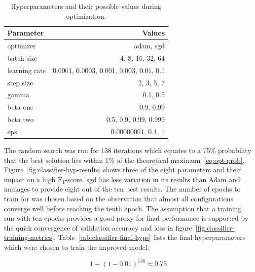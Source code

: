 \documentclass[draft,final]{vutinfth} %
\begin{document}
\begin{table}[h]
  \centering
  \begin{tabular}{lr}
    \toprule
    Parameter &  Values \\
    \midrule
    optimizer &	adam, sgd \\
    batch size & 4, 8, 16, 32, 64 \\
    learning rate & 0.0001, 0.0003, 0.001, 0.003, 0.01, 0.1 \\
    step size & 2, 3, 5, 7 \\
    gamma & 0.1, 0.5 \\
    beta one & 0.9, 0.99 \\
    beta two & 0.5, 0.9, 0.99, 0.999 \\
    eps & 0.00000001, 0.1, 1 \\
    \bottomrule
  \end{tabular}
  \caption{Hyperparameters and their possible values during
    optimization.}
  \label{tab:classifier-hyps}
\end{table}

The random search was run for \num{138} iterations which equates to a
75\% probability that the best solution lies within 1\% of the
theoretical
maximum~\eqref{eq:opt-prob}. Figure~\ref{fig:classifier-hyp-results}
shows three of the eight parameters and their impact on a high
$\mathrm{F}_1$-score. \gls{sgd} has less variation in its results than
Adam \cite{kingma2017} and manages to provide eight out of the ten
best results. The number of epochs to train for was chosen based on
the observation that almost all configurations converge well before
reaching the tenth epoch. The assumption that a training run with ten
epochs provides a good proxy for final performance is supported by the
quick convergence of validation accuracy and loss in
figure~\ref{fig:classifier-training-metrics}. Table~\ref{tab:classifier-final-hyps}
lists the final hyperparameters which were chosen to train the
improved model.

\begin{equation}\label{eq:opt-prob}
  1 - (1 - 0.01)^{138} \approx 0.75
\end{equation}
\end{document}
